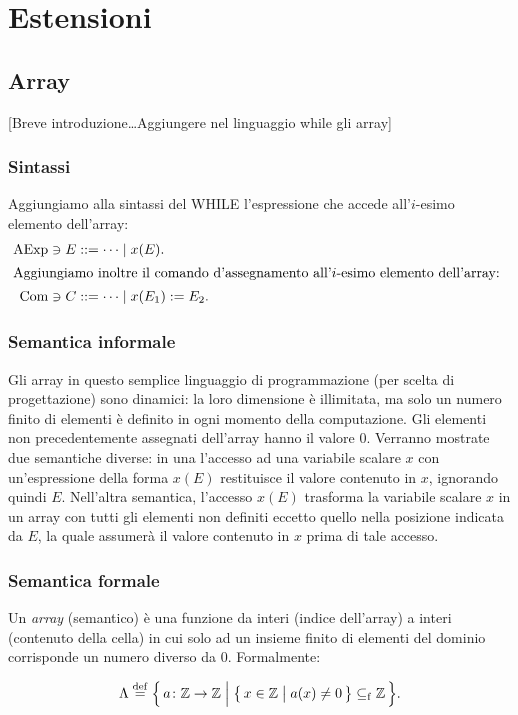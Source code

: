 \chapter{Estensioni}

\section{Array} 

[Breve introduzione\dots Aggiungere nel linguaggio while gli array]

\subsection{Sintassi}

Aggiungiamo alla sintassi del WHILE l'espressione che accede
all'$i$-esimo elemento dell'array:
\begin{align*}
  \AExp \ni E &::= \dots \vbar x(E). \\
\intertext{%
Aggiungiamo inoltre il comando d'assegnamento all'$i$-esimo elemento
dell'array:
}
  \Com \ni C &::= \dots \vbar x(E_1) := E_2.
\end{align*}

\subsection{Semantica informale}

Gli array in questo semplice linguaggio di programmazione (per scelta
di progettazione) sono dinamici: la loro dimensione è illimitata, ma
solo un numero finito di elementi è definito in ogni momento della
computazione.  Gli elementi non precedentemente assegnati dell'array
hanno il valore $0$.  Verranno mostrate due semantiche diverse: in una
l'accesso ad una variabile scalare $x$ con un'espressione della forma
$x(E)$ restituisce il valore contenuto in $x$, ignorando quindi $E$.
Nell'altra semantica, l'accesso $x(E)$ trasforma la variabile scalare
$x$ in un array con tutti gli elementi non definiti eccetto quello
nella posizione indicata da $E$, la quale assumerà il valore contenuto
in $x$ prima di tale accesso.

\subsection{Semantica formale}

\begin{definizione} 
Un \emph{array} (semantico) è una funzione da interi (indice
dell'array) a interi (contenuto della cella) in cui solo ad un insieme
finito di elementi del dominio corrisponde un numero diverso da $0$.
Formalmente:

\[
  \Lambda
    \defeq
      \Bigl\{\,
        \fund{a}{\Zset}{\Zset}
      \Bigm|
        \bigl\{\, x \in \Zset \bigm| a(x) \neq 0 \,\bigr\} \sseqf \Zset
      \,\Bigr\}.
\]
\end{definizione}

